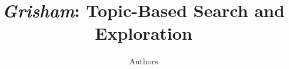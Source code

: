 \documentclass[letterpaper]{article}
\newcommand{\system}{\textsl{Grisham}\xspace}
\begin{document}
\title{\system: Topic-Based Search and Exploration}
\author{Authors}
\maketitle














\end{document}
